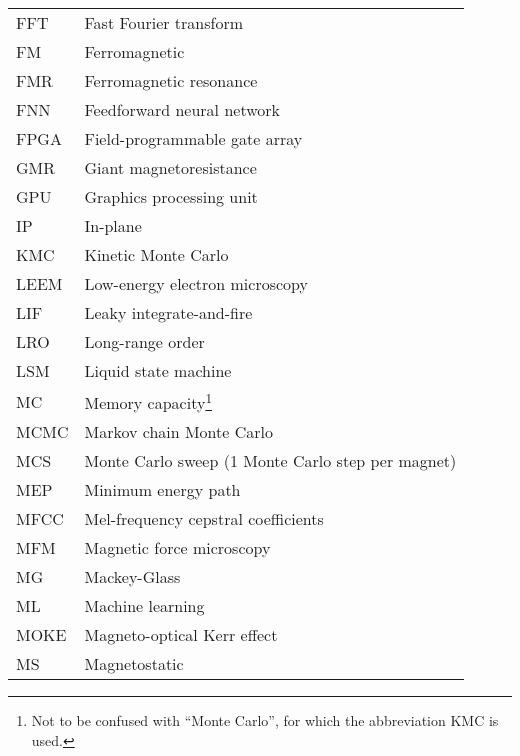 {\begin{longtable}[l]{ll}
        FFT   & Fast Fourier transform                      \\
        FM    & Ferromagnetic                               \\
        FMR   & Ferromagnetic resonance                     \\
        FNN   & Feedforward neural network                  \\
        FPGA  & Field-programmable gate array               \\
        GMR   & Giant magnetoresistance                     \\
        GPU   & Graphics processing unit                    \\
        IP    & In-plane                                    \\
        KMC   & Kinetic Monte Carlo                         \\
        LEEM  & Low-energy electron microscopy              \\
        LIF   & Leaky integrate-and-fire                    \\
        LRO   & Long-range order                            \\
        LSM   & Liquid state machine                        \\
        MC    & Memory capacity\footnote{Not to be confused with ``Monte Carlo'', for which the abbreviation KMC is used.} \\
        MCMC  & Markov chain Monte Carlo                    \\
        MCS   & Monte Carlo sweep (1 Monte Carlo step per magnet) \\
        MEP   & Minimum energy path                         \\
        MFCC  & Mel-frequency cepstral coefficients         \\
        MFM   & Magnetic force microscopy                   \\
        MG    & Mackey-Glass                                \\
        ML    & Machine learning                            \\
        MOKE  & Magneto-optical Kerr effect                 \\
        MS    & Magnetostatic                               \\

\end{longtable}}
